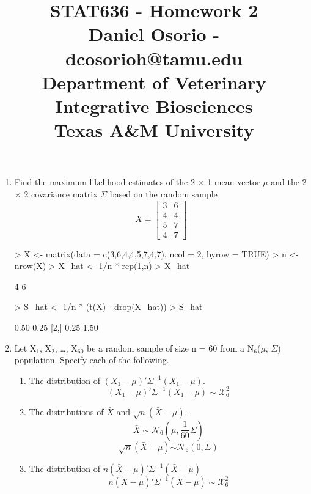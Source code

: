 \documentclass[12pt,a4paper]{paper}
\begin{document}
\title{STAT636 - Homework 2\\\small{Daniel Osorio - dcosorioh@tamu.edu\\Department of Veterinary Integrative Biosciences\\Texas A\&M University}}
\maketitle

\begin{enumerate}
\item Find the maximum likelihood estimates of the 2 $\times$ 1 mean vector $\mu$ and the 2 $\times$ 2 covariance matrix $\Sigma$ based on the random sample
\[X = \left[\begin{array}{cc}3 & 6\\4 & 4\\5 & 7\\4 & 7\end{array}\right]\]
\begin{Schunk}
\begin{Sinput}
> X <- matrix(data = c(3,6,4,4,5,7,4,7), ncol = 2, byrow = TRUE)
> n <- nrow(X)
> X_hat <- 1/n * rep(1,n) %
> X_hat
\end{Sinput}
\begin{Soutput}
     [,1] [,2]
[1,]    4    6
\end{Soutput}
\begin{Sinput}
> S_hat <- 1/n * (t(X) - drop(X_hat)) %
> S_hat
\end{Sinput}
\begin{Soutput}
     [,1] [,2]
[1,] 0.50 0.25
[2,] 0.25 1.50
\end{Soutput}
\end{Schunk}
\item Let X$_{1}$, X$_{2}$, \dots, X$_{60}$ be a random sample of size n = 60 from a N$_{6}$($\mu$, $\Sigma$) population. Specify each of the following.
\begin{enumerate}
\item The distribution of $(X_{1} - \mu)'\Sigma^{-1}(X_{1} - \mu)$. \[(X_{1} - \mu)'\Sigma^{-1}(X_{1} - \mu) \sim \mathcal{X}^{2}_{6}\]
\item The distributions of $\bar{X}$ and $\sqrt{n}(\bar{X} - \mu)$.
\[\bar{X} \sim \mathcal{N}_{6}\left(\mu, \frac{1}{60}\Sigma \right)\]
\[\sqrt{n}(\bar{X} - \mu) \mathrel{\dot\sim} \mathcal{N}_{6}\left(0, \Sigma\right)\]
\item The distribution of $n(\bar{X}-\mu)'\Sigma^{-1}(\bar{X} - \mu)$ \[n(\bar{X}-\mu)'\Sigma^{-1}(\bar{X} - \mu) \sim \mathcal{X}^{2}_{6}\]

\end{enumerate}
\end{enumerate}
\end{document}
